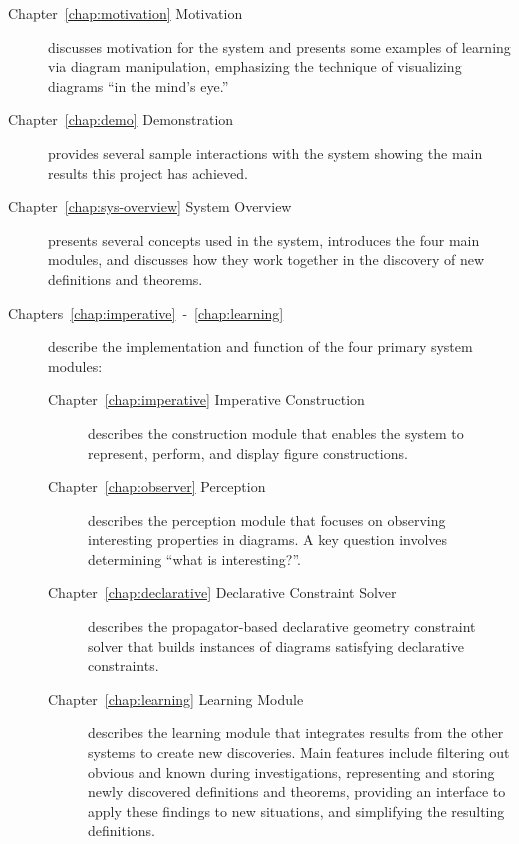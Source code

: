 \begin{description}

\item [Chapter~\ref{chap:motivation} Motivation] discusses motivation
  for the system and presents some examples of learning via diagram
  manipulation, emphasizing the technique of visualizing diagrams ``in
  the mind's eye.''

\item [Chapter~\ref{chap:demo} Demonstration] provides several sample
  interactions with the system showing the main results this project
  has achieved.

\item[Chapter~\ref{chap:sys-overview} System Overview] presents
  several concepts used in the system, introduces the four main
  modules, and discusses how they work together in the discovery of
  new definitions and theorems.

\item[Chapters~\ref{chap:imperative}~-~\ref{chap:learning}] describe
  the implementation and function of the four primary system modules:

\begin{description}
\item[Chapter~\ref{chap:imperative} Imperative Construction]
  describes the construction module that enables the system to
  represent, perform, and display figure constructions.

\item[Chapter~\ref{chap:observer} Perception] describes the perception
  module that focuses on observing interesting properties in
  diagrams. A key question involves determining ``what is
  interesting?''.

\item[Chapter~\ref{chap:declarative} Declarative Constraint Solver]
  describes the propagator-based declarative geometry constraint
  solver that builds instances of diagrams satisfying declarative
  constraints.

\item[Chapter~\ref{chap:learning} Learning Module] describes the
  learning module that integrates results from the other systems to
  create new discoveries. Main features include filtering out obvious
  and known during investigations, representing and storing
  newly discovered definitions and theorems, providing an interface to
  apply these findings to new situations, and simplifying the
  resulting definitions.

\end{description}
\newpage


\end{description}
